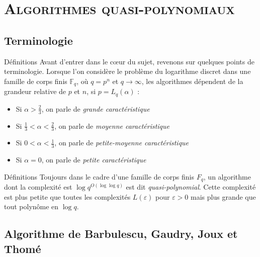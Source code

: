 \documentclass[xcolor=x11names,compress]{beamer}
\theoremstyle{break}
\theoremstyle{sc}
\theoremstyle{definition}
\theoremstyle{remark}
\begin{document}
\section{\scshape Algorithmes quasi-polynomiaux}
\subsection{Terminologie}
\begin{frame}{Définitions}
  Avant d'entrer dans le cœur du sujet, revenons sur quelques points de
  terminologie. Lorsque l'on considère le problème du logarithme discret dans
  une famille de corps finis $\mathbb{F}_{q}$, où $q=p^n$ et $q\to\infty$, les
  algorithmes dépendent de la grandeur relative de $p$ et $n$, si
  $p=L_q(\alpha)$ :
  \begin{itemize}
    \item Si $\alpha>\frac{2}{3}$, on parle de \emph{grande caractéristique}
    \item Si $\frac{1}{3} <\alpha<\frac{2}{3}$, on parle de \emph{moyenne caractéristique}
    \item Si $0 <\alpha<\frac{1}{3}$, on parle de \emph{petite-moyenne caractéristique}
    \item Si $\alpha = 0$, on parle de \emph{petite caractéristique}
  \end{itemize}
\end{frame}


\begin{frame}{Définitions}
 Toujours dans le cadre d'une famille de corps finis $F_q$, un algorithme dont
 la complexité est  $\log q^{O(\log\log q)}$ est dit \emph{quasi-polynomial}. Cette
 complexité est plus petite que toutes les complexités $L(\varepsilon)$ pour
 $\varepsilon>0$ mais plus grande que tout polynôme en $\log q$.
\end{frame}

\subsection{Algorithme de Barbulescu, Gaudry, Joux et Thomé}
\end{document}

